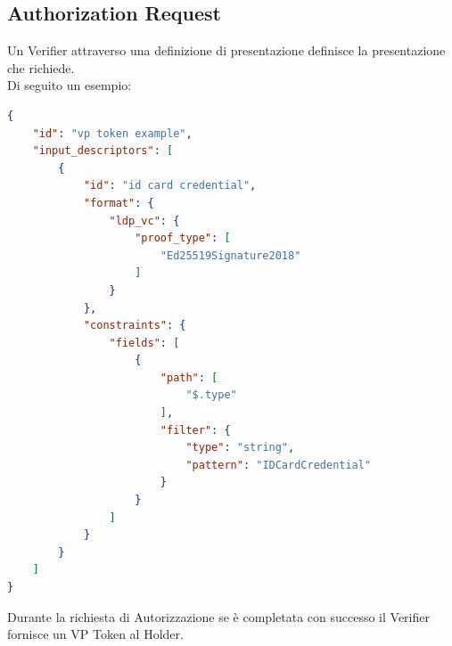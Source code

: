 \subsection{Authorization Request}
Un Verifier attraverso una definizione di presentazione definisce la presentazione che richiede.\\
Di seguito un esempio:
\begin{lstlisting}[language=json,firstnumber=1]
{
    "id": "vp token example",
    "input_descriptors": [
        {
            "id": "id card credential",
            "format": {
                "ldp_vc": {
                    "proof_type": [
                        "Ed25519Signature2018"
                    ]
                }
            },
            "constraints": {
                "fields": [
                    {
                        "path": [
                            "$.type"
                        ],
                        "filter": {
                            "type": "string",
                            "pattern": "IDCardCredential"
                        }
                    }
                ]
            }
        }
    ]
}
\end{lstlisting}
Durante la richiesta di Autorizzazione se è completata con successo il Verifier fornisce un VP Token al Holder.
\\
